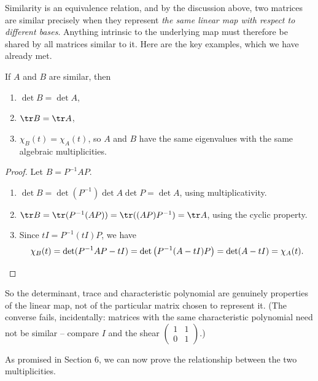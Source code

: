 \documentclass[a4paper]{scrartcl}
\begin{document}
Similarity is an equivalence relation, and by the discussion above, two matrices are similar precisely when they represent \emph{the same linear map with respect to different bases}. Anything intrinsic to the underlying map must therefore be shared by all matrices similar to it. Here are the key examples, which we have already met.

\begin{proposition}
	If $A$ and $B$ are similar, then
	\begin{enumerate}[label=(\roman*)]
		\item $\det B = \det A$,
		\item $\tr B = \tr A$,
		\item $\chi_B(t) = \chi_A(t)$, so $A$ and $B$ have the same eigenvalues with the same algebraic multiplicities.
	\end{enumerate}
\end{proposition}
\begin{proof}
	Let $B = P^{-1}AP$.
	\begin{enumerate}[label=(\roman*)]
		\item $\det B = \det(P^{-1})\det A \det P = \det A$, using multiplicativity.
		\item $\tr B = \tr(P^{-1}(AP)) = \tr((AP)P^{-1}) = \tr A$, using the cyclic property.
		\item Since $tI = P^{-1}(tI)P$, we have
		$$
		\chi_B(t) = \det(P^{-1}AP - tI) = \det\left(P^{-1}(A - tI)P\right) = \det(A - tI) = \chi_A(t). \qedhere
		$$
	\end{enumerate}
\end{proof}

So the determinant, trace and characteristic polynomial are genuinely properties of the linear map, not of the particular matrix chosen to represent it. (The converse fails, incidentally: matrices with the same characteristic polynomial need not be similar -- compare $I$ and the shear $\begin{pmatrix} 1 & 1 \\ 0 & 1\end{pmatrix}$.)

As promised in Section 6, we can now prove the relationship between the two multiplicities.
\end{document}
